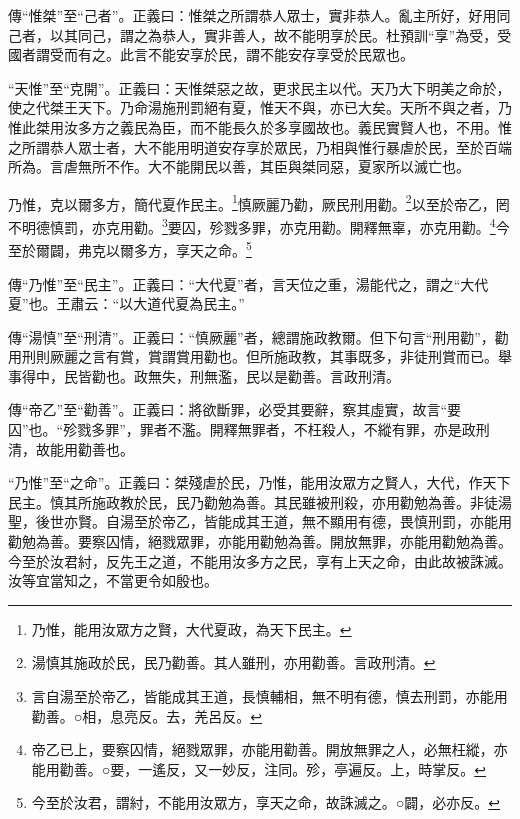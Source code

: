 {\noindent\zhuan{}\fzbyks 傳“惟桀”至“己者”。正義曰：惟桀之所謂恭人眾士，實非恭人。亂主所好，好用同己者，以其同己，謂之為恭人，實非善人，故不能明享於民。杜預訓“享”為受，受國者謂受而有之。此言不能安享於民，謂不能安存享受於民眾也。 \par}

{\noindent\shu{}\fzkt “天惟”至“克開”。正義曰：天惟桀惡之故，更求民主以代。天乃大下明美之命於，使之代桀王天下。乃命湯施刑罰絕有夏，惟天不與，亦已大矣。天所不與之者，乃惟此桀用汝多方之義民為臣，而不能長久於多享國故也。義民實賢人也，不用。惟之所謂恭人眾士者，大不能用明道安存享於眾民，乃相與惟行暴虐於民，至於百端所為。言虐無所不作。大不能開民以善，其臣與桀同惡，夏家所以滅亡也。 \par}

乃惟，克以爾多方，簡代夏作民主。\footnote{乃惟，能用汝眾方之賢，大代夏政，為天下民主。}慎厥麗乃勸，厥民刑用勸。\footnote{湯慎其施政於民，民乃勸善。其人雖刑，亦用勸善。言政刑清。}以至於帝乙，罔不明德慎罰，亦克用勸。\footnote{言自湯至於帝乙，皆能成其王道，長慎輔相，無不明有德，慎去刑罰，亦能用勸善。○相，息亮反。去，羌呂反。}要囚，殄戮多罪，亦克用勸。開釋無辜，亦克用勸。\footnote{帝乙已上，要察囚情，絕戮眾罪，亦能用勸善。開放無罪之人，必無枉縱，亦能用勸善。○要，一遙反，又一妙反，注同。殄，亭遍反。上，時掌反。}今至於爾闢，弗克以爾多方，享天之命。\footnote{今至於汝君，謂紂，不能用汝眾方，享天之命，故誅滅之。○闢，必亦反。}


{\noindent\zhuan{}\fzbyks 傳“乃惟”至“民主”。正義曰：“大代夏”者，言天位之重，湯能代之，謂之“大代夏”也。王肅云：“以大道代夏為民主。” \par}

{\noindent\zhuan{}\fzbyks 傳“湯慎”至“刑清”。正義曰：“慎厥麗”者，總謂施政教爾。但下句言“刑用勸”，勸用刑則厥麗之言有賞，賞謂賞用勸也。但所施政教，其事既多，非徒刑賞而已。舉事得中，民皆勸也。政無失，刑無濫，民以是勸善。言政刑清。 \par}

{\noindent\zhuan{}\fzbyks 傳“帝乙”至“勸善”。正義曰：將欲斷罪，必受其要辭，察其虛實，故言“要囚”也。“殄戮多罪”，罪者不濫。開釋無罪者，不枉殺人，不縱有罪，亦是政刑清，故能用勸善也。 \par}

{\noindent\shu{}\fzkt “乃惟”至“之命”。正義曰：桀殘虐於民，乃惟，能用汝眾方之賢人，大代，作天下民主。慎其所施政教於民，民乃勸勉為善。其民雖被刑殺，亦用勸勉為善。非徒湯聖，後世亦賢。自湯至於帝乙，皆能成其王道，無不顯用有德，畏慎刑罰，亦能用勸勉為善。要察囚情，絕戮眾罪，亦能用勸勉為善。開放無罪，亦能用勸勉為善。今至於汝君紂，反先王之道，不能用汝多方之民，享有上天之命，由此故被誅滅。汝等宜當知之，不當更令如殷也。 \par}


